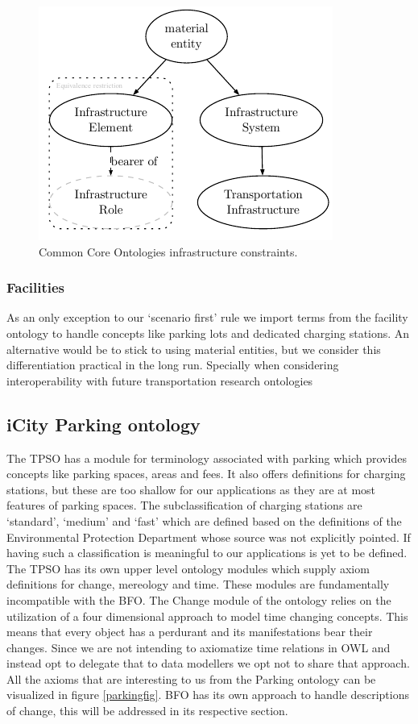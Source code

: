 \begin{figure}[h]
    \centering
    \includegraphics{images/infrastructureSystem.pdf}
    \caption{Common Core Ontologies infrastructure constraints.}
    \label{infrastructurefigs} 
\end{figure}

\subsubsection{Facilities}

As an only exception to our `scenario first' rule we import terms from the
facility ontology to handle concepts like parking lots and dedicated charging
stations. An alternative would be to stick to using material entities, but we
consider this differentiation practical in the long run. Specially when
considering interoperability with future transportation research ontologies


\subsection{iCity Parking ontology}

The TPSO has a module for terminology associated with parking which provides
concepts like parking spaces, areas and fees. It also offers definitions for
charging stations, but these are too shallow for our applications as they are
at most features of parking spaces. The subclassification of charging stations
are `standard', `medium' and `fast' which are defined based on the definitions
of the Environmental Protection Department whose source was not explicitly
pointed. If having such a classification is meaningful to our applications is
yet to be defined. The TPSO has its own upper level ontology modules which
supply axiom definitions for change, mereology and time. These modules are
fundamentally incompatible with the BFO. The Change module of the ontology
relies on the utilization of a four dimensional approach to model time changing
concepts. This means that every object has a perdurant and its manifestations
bear their changes. Since we are not intending to axiomatize time relations in
OWL and instead opt to delegate that to data modellers we opt not to share that
approach. All the axioms that are interesting to us from the Parking ontology
can be visualized in figure \ref{parkingfig}. BFO has its own approach to
handle descriptions of change, this will be addressed in its respective
section.

